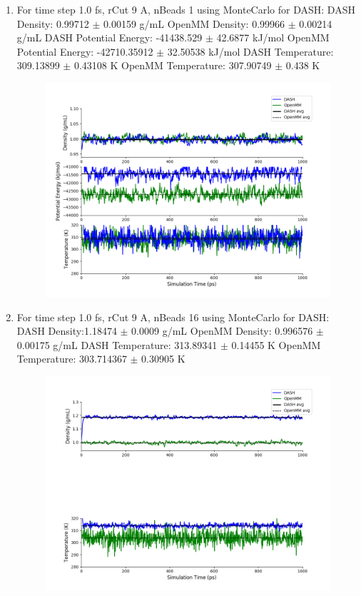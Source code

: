 \documentclass[12pt,reqno]{amsart}
\numberwithin{equation}{section}
\begin{document}
\begin{enumerate}
\item For time step 1.0 fs, rCut 9 A, nBeads 1 using MonteCarlo for DASH:
\subitem DASH Density: 0.99712 $\pm$ 0.00159 g/mL
\subitem OpenMM Density: 0.99966 $\pm$ 0.00214 g/mL
\subitem DASH Potential Energy: -41438.529 $\pm$ 42.6877 kJ/mol
\subitem OpenMM Potential Energy: -42710.35912 $\pm$ 32.50538 kJ/mol
\subitem DASH Temperature: 309.13899 $\pm$ 0.43108  K
\subitem OpenMM Temperature:  307.90749 $\pm$ 0.438 K
\begin{figure}[H]
\centering
\includegraphics[scale=0.7]{MC-MM-nBead1-rCut9-ts1}
\end{figure}

\item For time step 1.0 fs, rCut 9 A, nBeads 16 using MonteCarlo for DASH:
\subitem DASH Density:1.18474 $\pm$ 0.0009 g/mL
\subitem OpenMM Density: 0.996576 $\pm$ 0.00175 g/mL
\subitem DASH Temperature: 313.89341 $\pm$ 0.14455  K
\subitem OpenMM Temperature:  303.714367 $\pm$ 0.30905 K
\begin{figure}[H]
\centering
\includegraphics[scale=0.7]{MC-MM-nBead16-rCut9-ts1}
\end{figure}


\end{enumerate}
\end{document}
